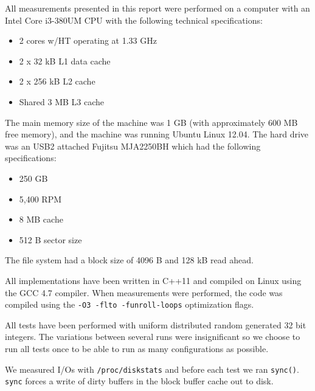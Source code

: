 All measurements presented in this report were performed on a computer
with an Intel Core i3-380UM CPU with the following technical
specifications:
\begin{itemize}
\item 2 cores w/HT operating at 1.33 GHz
\item 2 x 32 kB L1 data cache
\item 2 x 256 kB L2 cache
\item Shared 3 MB L3 cache
\end{itemize}
The main memory size of the machine was 1 GB (with approximately 600 MB free memory), and the machine was running Ubuntu
Linux 12.04. The hard drive was an USB2 attached Fujitsu MJA2250BH which had the following specifications:

\begin{itemize}
\item 250 GB
\item 5,400 RPM
\item 8 MB cache
\item 512 B sector size
\end{itemize}

The file system had a block size of 4096 B and 128 kB read ahead.

All implementations have been
written in C++11 and compiled on Linux using the GCC 4.7 compiler. When measurements were performed, the
code was compiled using the \texttt{-O3 -flto -funroll-loops}
optimization flags.

All tests have been performed with uniform distributed random generated 32 bit integers. The variations between several runs were insignificant so we choose to run all tests once to be able to run as many configurations as possible.

We measured I/Os with \texttt{/proc/diskstats} and before each test we ran \texttt{sync()}. \texttt{sync} forces a write of dirty buffers in the block buffer cache out to disk.